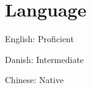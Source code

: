 \section{Language}


\hspace{1em}
\begin{minipage}{0.3\textwidth}
	English: {\hfill {\small{Proficient}}}\\
\end{minipage}
\hspace{1em}
\begin{minipage}{0.3\textwidth}
	Danish: {\hfill {\small{Intermediate}}}\\
\end{minipage}
\hspace{1em}
\begin{minipage}{0.3\textwidth}
	Chinese: {\hfill {\small{Native}}}\\
\end{minipage}